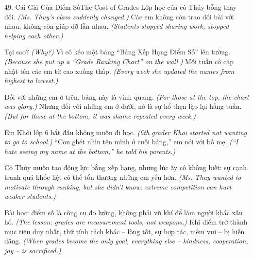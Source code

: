 \begin{truyen}{49. Cái Giá Của Điểm Số}{The Cost of Grades}
Lớp học của cô Thúy bỗng thay đổi.
\textit{(Ms. Thuy's class suddenly changed.)}
Các em không còn trao đổi bài với nhau, không còn giúp đỡ lẫn nhau.
\textit{(Students stopped sharing work, stopped helping each other.)}

Tại sao?
\textit{(Why?)}
Vì cô kéo một bảng ``Bảng Xếp Hạng Điểm Số'' lên tường.
\textit{(Because she put up a ``Grade Ranking Chart'' on the wall.)}
Mỗi tuần cô cập nhật tên các em từ cao xuống thấp.
\textit{(Every week she updated the names from highest to lowest.)}

Đối với những em ở trên, bảng này là vinh quang.
\textit{(For those at the top, the chart was glory.)}
Nhưng đối với những em ở dưới, nó là sự hổ thẹn lặp lại hằng tuần.
\textit{(But for those at the bottom, it was shame repeated every week.)}

Em Khôi lớp 6 bắt đầu không muốn đi học.
\textit{(6th grader Khoi started not wanting to go to school.)}
``Con ghét nhìn tên mình ở cuối bảng,'' em nói với bố mẹ.
\textit{(``I hate seeing my name at the bottom,'' he told his parents.)}

Cô Thúy muốn tạo động lực bằng xếp hạng, nhưng lúc ấy cô không biết: sự cạnh tranh quá khốc liệt có thể tổn thương những em yếu hơn.
\textit{(Ms. Thuy wanted to motivate through ranking, but she didn't know: extreme competition can hurt weaker students.)}

Bài học: điểm số là công cụ đo lường, không phải vũ khí để làm người khác xấu hổ.
\textit{(The lesson: grades are measurement tools, not weapons.)}
Khi điểm trở thành mục tiêu duy nhất, thứ tính cách khác -- lòng tốt, sự hợp tác, niềm vui -- bị hiến dâng.
\textit{(When grades become the only goal, everything else -- kindness, cooperation, joy -- is sacrificed.)}
\end{truyen}

